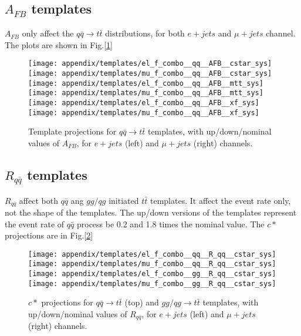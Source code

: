 \documentclass{cmspaperpdf}
\begin{document}
\subsection{$A_{FB}$ templates}
$A_{FB}$ only affect the $q\bar q \rightarrow t \bar t$ distributions, for both $e+jets$ and $\mu+jets$ channel. The plots are shown in Fig.[\ref{appendix:afb_temps}]
\begin{figure}[hbt]
  \begin{center}
    \texttt{[image: appendix/templates/el\_f\_combo\_\_qq\_\_AFB\_\_cstar\_sys]}
    \texttt{[image: appendix/templates/mu\_f\_combo\_\_qq\_\_AFB\_\_cstar\_sys]}
    \texttt{[image: appendix/templates/el\_f\_combo\_\_qq\_\_AFB\_\_mtt\_sys]}
    \texttt{[image: appendix/templates/mu\_f\_combo\_\_qq\_\_AFB\_\_mtt\_sys]}
    \texttt{[image: appendix/templates/el\_f\_combo\_\_qq\_\_AFB\_\_xf\_sys]}
    \texttt{[image: appendix/templates/mu\_f\_combo\_\_qq\_\_AFB\_\_xf\_sys]}
  \caption{\small Template projections for $q\bar q \rightarrow t\bar t$ templates, with up/down/nominal values of $A_{FB}$, for $e+jets$ (left) and $\mu+jets$ (right) channels. }
  \label{appendix:afb_temps}
  \end{center}
\end{figure}
 
\subsection{$R_{q\bar q}$ templates}
$R_{q\bar q}$ affect both $q\bar q$ ang $gg/qg$ initiated $t\bar t$ templates. It affect the event rate only, not the shape of the templates. The up/down versions of the templates represent the event rate of $q\bar q$ process be 0.2 and 1.8 times the nominal value. The $c*$ projections are in Fig.[\ref{appendix:Rqq_temps}]

\begin{figure}[hbt]
  \begin{center}
    \texttt{[image: appendix/templates/el\_f\_combo\_\_qq\_\_R\_qq\_\_cstar\_sys]}
    \texttt{[image: appendix/templates/mu\_f\_combo\_\_qq\_\_R\_qq\_\_cstar\_sys]}
    \texttt{[image: appendix/templates/el\_f\_combo\_\_gg\_\_R\_qq\_\_cstar\_sys]}
    \texttt{[image: appendix/templates/mu\_f\_combo\_\_gg\_\_R\_qq\_\_cstar\_sys]}
  \caption{\small $c*$ projections for $q\bar q \rightarrow t\bar t$ (top) and $gg/qg \rightarrow t\bar t$ templates, with up/down/nominal values of $R_{q\bar q}$, for $e+jets$ (left) and $\mu+jets$ (right) channels. }
  \label{appendix:Rqq_temps}
  \end{center}
\end{figure}
 
\end{document}
